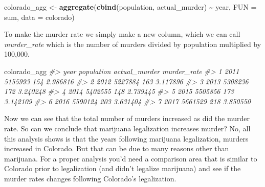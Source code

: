 \documentclass[
  12pt,
]{book}
\newenvironment{Shaded}{\begin{snugshade}}{\end{snugshade}}
\newcommand{\CommentTok}[1]{\textcolor[rgb]{0.37,0.37,0.37}{\textit{#1}}}
\newcommand{\DataTypeTok}[1]{\textcolor[rgb]{0.27,0.27,0.27}{#1}}
\newcommand{\DecValTok}[1]{\textcolor[rgb]{0.06,0.06,0.06}{#1}}
\newcommand{\KeywordTok}[1]{\textcolor[rgb]{0.27,0.27,0.27}{\textbf{#1}}}
\newcommand{\NormalTok}[1]{#1}
\newcommand{\OperatorTok}[1]{\textcolor[rgb]{0.43,0.43,0.43}{\textbf{#1}}}
\newcommand{\StringTok}[1]{\textcolor[rgb]{0.5,0.5,0.5}{#1}}
\begin{document}
\begin{Shaded}
\begin{Highlighting}[]
\NormalTok{colorado\_agg <{-}}\StringTok{ }\KeywordTok{aggregate}\NormalTok{(}\KeywordTok{cbind}\NormalTok{(population, actual\_murder) }\OperatorTok{\textasciitilde{}}\StringTok{ }\NormalTok{year, }\DataTypeTok{FUN =}\NormalTok{ sum, }\DataTypeTok{data =}\NormalTok{ colorado)}
\end{Highlighting}
\end{Shaded}

To make the murder rate we simply make a new column, which we can call \emph{murder\_rate} which is the number of murders divided by population multiplied by 100,000.

\begin{Shaded}
\end{Shaded}

\begin{Shaded}
\begin{Highlighting}[]
\NormalTok{colorado\_agg}
\CommentTok{\#>   year population actual\_murder murder\_rate}
\CommentTok{\#> 1 2011    5155993           154    2.986816}
\CommentTok{\#> 2 2012    5227884           163    3.117896}
\CommentTok{\#> 3 2013    5308236           172    3.240248}
\CommentTok{\#> 4 2014    5402555           148    2.739445}
\CommentTok{\#> 5 2015    5505856           173    3.142109}
\CommentTok{\#> 6 2016    5590124           203    3.631404}
\CommentTok{\#> 7 2017    5661529           218    3.850550}
\end{Highlighting}
\end{Shaded}

Now we can see that the total number of murders increased as did the murder rate. So can we conclude that marijuana legalization increases murder? No, all this analysis shows is that the years following marijuana legalization, murders increased in Colorado. But that can be due to many reasons other than marijuana. For a proper analysis you'd need a comparison area that is similar to Colorado prior to legalization (and didn't legalize marijuana) and see if the murder rates changes following Colorado's legalization.
\end{document}
